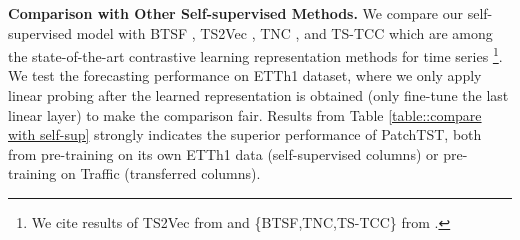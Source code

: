 \documentclass{article} \usepackage{iclr2023_conference,times}
\begin{document}
\textbf{Comparison with Other Self-supervised Methods.} We compare our self-supervised model with BTSF \citep{btsf}, TS2Vec \citep{ts2vec}, TNC \citep{tnc}, and TS-TCC \citep{ts-tcc} which are among the state-of-the-art contrastive learning representation methods for time series \footnote{We cite results of TS2Vec from \citep{ts2vec} and \{BTSF,TNC,TS-TCC\} from \citep{btsf}.}. We test the forecasting performance on ETTh1 dataset, where we only apply linear probing after the learned representation is obtained (only fine-tune the last linear layer) to make the comparison fair. Results from Table \ref{table::compare with self-sup} strongly indicates the superior performance of PatchTST, both from pre-training on its own ETTh1 data (self-supervised columns) or pre-training on Traffic (transferred columns).
\end{document}
